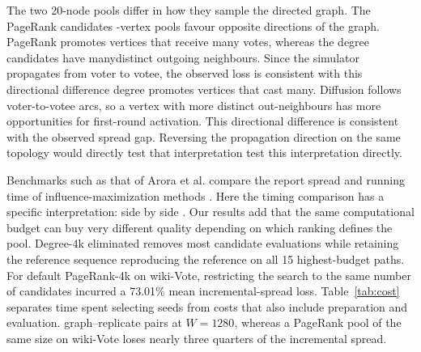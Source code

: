 \documentclass[smallextended]{svjour3}
\providecommand{\DIFaddtex}[1]{{\protect\color{blue} \sf #1}} %
\providecommand{\DIFdeltex}[1]{{\protect\color{red} \scriptsize #1}} %
\providecommand{\DIFaddbegin}{} %
\providecommand{\DIFaddend}{} %
\providecommand{\DIFdelbegin}{} %
\providecommand{\DIFdelend}{} %
\providecommand{\DIFadd}[1]{\texorpdfstring{\DIFaddtex{#1}}{#1}} %
\providecommand{\DIFdel}[1]{\texorpdfstring{\DIFdeltex{#1}}{}} %
\providecommand{\DIFscaledelfig}{0.5}
\newlength{\DIFdelgraphicswidth} %
\newlength{\DIFdelgraphicsheight} %
\providecommand{\DIFaddincludegraphics}[2][]{{\color{blue}\fbox{\DIFOincludegraphics[#1]{#2}}}} %
\providecommand{\DIFdelincludegraphics}[2][]{%
\sbox{\DIFdelgraphicsbox}{\DIFOincludegraphics[#1]{#2}}%
\settoboxwidth{\DIFdelgraphicswidth}{\DIFdelgraphicsbox} %
\settoboxtotalheight{\DIFdelgraphicsheight}{\DIFdelgraphicsbox} %
\scalebox{\DIFscaledelfig}{%
\parbox[b]{\DIFdelgraphicswidth}{\usebox{\DIFdelgraphicsbox}\\[-\baselineskip] \rule{\DIFdelgraphicswidth}{0em}}\llap{\resizebox{\DIFdelgraphicswidth}{\DIFdelgraphicsheight}{%
\setlength{\unitlength}{\DIFdelgraphicswidth}%
\begin{picture}(1,1)%
\thicklines\linethickness{2pt} %
{\color[rgb]{1,0,0}\put(0,0){\framebox(1,1){}}}%
{\color[rgb]{1,0,0}\put(0,0){\line( 1,1){1}}}%
{\color[rgb]{1,0,0}\put(0,1){\line(1,-1){1}}}%
\end{picture}%
}\hspace*{3pt}}} %
} %
\DeclareRobustCommand{\DIFaddbegin}{\DIFOaddbegin \let\includegraphics\DIFaddincludegraphics} %
\DeclareRobustCommand{\DIFaddend}{\DIFOaddend \let\includegraphics\DIFOincludegraphics} %
\DeclareRobustCommand{\DIFdelbegin}{\DIFOdelbegin \let\includegraphics\DIFdelincludegraphics} %
\DeclareRobustCommand{\DIFdelend}{\DIFOaddend \let\includegraphics\DIFOincludegraphics} %
\begin{document}
The two \DIFdelbegin \DIFdel{20-node pools differ in how they sample the directed graph. The PageRank candidates }\DIFdelend \DIFaddbegin \DIFadd{20-vertex pools favour opposite directions of the graph. PageRank promotes vertices that }\DIFaddend receive many votes, whereas \DIFdelbegin \DIFdel{the degree candidates have manydistinct outgoing neighbours. Since the simulator propagates from voter to votee, the observed loss is consistent with this directional difference }\DIFdelend \DIFaddbegin \DIFadd{degree promotes vertices that cast many}\DIFaddend . \DIFaddbegin \DIFadd{Diffusion follows voter-to-votee arcs, so a vertex with more distinct out-neighbours has more opportunities for first-round activation. This directional difference is consistent with the observed spread gap. }\DIFaddend Reversing the propagation direction on the same topology would \DIFdelbegin \DIFdel{directly test that interpretation }\DIFdelend \DIFaddbegin \DIFadd{test this interpretation directly}\DIFaddend .

\DIFaddbegin \DIFadd{Benchmarks such as that of }\DIFaddend Arora et al. \DIFdelbegin \DIFdel{compare the }\DIFdelend \DIFaddbegin \DIFadd{report }\DIFaddend spread and running time \DIFdelbegin \DIFdel{of influence-maximization methods \cite{ref16}. Here the timing comparison has a specific interpretation: }\DIFdelend \DIFaddbegin \DIFadd{side by side \cite{ref16}. Our results add that the same computational budget can buy very different quality depending on which ranking defines the pool. }\DIFaddend Degree-4k \DIFdelbegin \DIFdel{eliminated }\DIFdelend \DIFaddbegin \DIFadd{removes }\DIFaddend most candidate evaluations while \DIFdelbegin \DIFdel{retaining the reference sequence }\DIFdelend \DIFaddbegin \DIFadd{reproducing the reference }\DIFaddend on all 15 \DIFdelbegin \DIFdel{highest-budget paths. For default PageRank-4k on wiki-Vote, restricting the search to the same number of candidates incurred a 73.01\% mean incremental-spread loss.
Table~\ref{tab:cost} separates time spent selecting seeds from costs that also include preparation and evaluation.
}\DIFdelend \DIFaddbegin \DIFadd{graph--replicate pairs at $W=1280$, whereas a PageRank pool of the same size on wiki-Vote loses nearly three quarters of the incremental spread.
}\DIFaddend 
\end{document}
